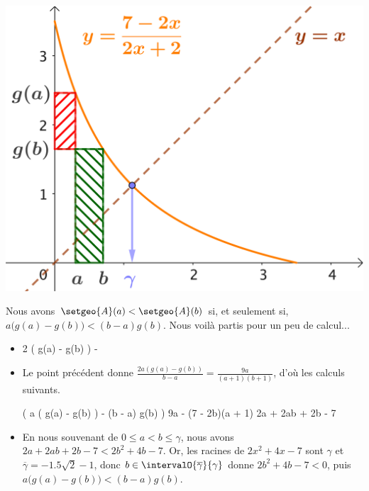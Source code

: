 \smallskip

\begin{center}
	\includegraphics[scale=.67]{geo-sol.png}
\end{center}

Nous avons
$\setgeo{A}(a) < \setgeo{A}(b)$
si, et seulement si,
$a \big( g(a) - g(b) \big) < (b - a) g(b)$.
Nous voilà partis pour un peu de calcul...
%
\begin{itemize}
	\item
	\begin{stepcalc}[style=sar]
		2 \big( g(a) - g(b) \big)
	\explnext{}
		 - 
	\explnext{}
	\explnext{}
	\end{stepcalc}


	\item Le point précédent donne
	$\frac{2 a ( g(a) - g(b) )}{b - a} = \frac{9a}{(a + 1)(b + 1)}$,
	d'où les calculs suivants.

	\noindent\kern-8pt\begin{stepcalc}[style=ar*]
		 \Big( 
			  a \big( g(a) - g(b) \big) 
			- (b - a) g(b) 
		\Big)
	\explnext{}
		  9a - (7 - 2b)(a + 1)
	\explnext{}
		2a + 2ab + 2b - 7
	\end{stepcalc}


	\item En nous souvenant de $0 \leq a < b \leq \gamma$, nous avons
	$2a + 2ab + 2b - 7 < 2b^2 + 4b - 7$.
	Or, les racines de $2 x^2 + 4 x - 7$ sont $\gamma$ et $\overline{\gamma} = - \num{1.5} \sqrt{2} - 1$, 
	donc $b \in \intervalO{\overline{\gamma}}{\gamma}$ donne 
	$2b^2 + 4b - 7 < 0$, puis 
	$a \big( g(a) - g(b) \big) < (b - a) g(b)$.
\end{itemize}


